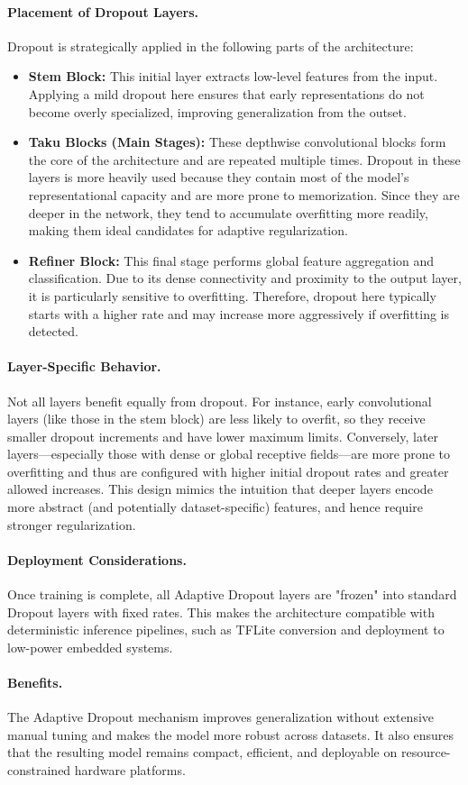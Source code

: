 \paragraph{Placement of Dropout Layers.} Dropout is strategically applied in the following parts of the architecture:
\begin{itemize}
    \item \textbf{Stem Block:} This initial layer extracts low-level features from the input. Applying a mild dropout here ensures that early representations do not become overly specialized, improving generalization from the outset.
    
    \item \textbf{Taku Blocks (Main Stages):} These depthwise convolutional blocks form the core of the architecture and are repeated multiple times. Dropout in these layers is more heavily used because they contain most of the model’s representational capacity and are more prone to memorization. Since they are deeper in the network, they tend to accumulate overfitting more readily, making them ideal candidates for adaptive regularization.
    
    \item \textbf{Refiner Block:} This final stage performs global feature aggregation and classification. Due to its dense connectivity and proximity to the output layer, it is particularly sensitive to overfitting. Therefore, dropout here typically starts with a higher rate and may increase more aggressively if overfitting is detected.
\end{itemize}

\paragraph{Layer-Specific Behavior.} Not all layers benefit equally from dropout. For instance, early convolutional layers (like those in the stem block) are less likely to overfit, so they receive smaller dropout increments and have lower maximum limits. Conversely, later layers—especially those with dense or global receptive fields—are more prone to overfitting and thus are configured with higher initial dropout rates and greater allowed increases. This design mimics the intuition that deeper layers encode more abstract (and potentially dataset-specific) features, and hence require stronger regularization.

\paragraph{Deployment Considerations.} Once training is complete, all Adaptive Dropout layers are "frozen" into standard Dropout layers with fixed rates. This makes the architecture compatible with deterministic inference pipelines, such as TFLite conversion and deployment to low-power embedded systems.

\paragraph{Benefits.} The Adaptive Dropout mechanism improves generalization without extensive manual tuning and makes the model more robust across datasets. It also ensures that the resulting model remains compact, efficient, and deployable on resource-constrained hardware platforms.

